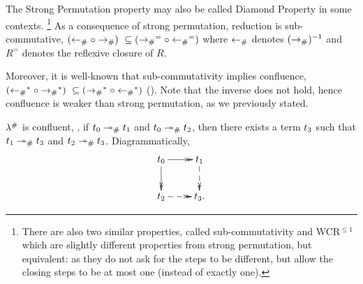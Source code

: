 \bigskip


The Strong Permutation property may also be called Diamond Property in some contexts.
\footnote{There are also two similar properties, called sub-commutativity and WCR$^{\leq 1}$
which are slightly different properties
from strong permutation,
but equivalent:
as they do not ask for the steps to be different,
but allow the closing steps to be at most one (instead of exactly one).}
As a consequence of strong permutation, reduction is sub-commutative,
\ie $(\mathrel{\leftarrow_{\mathtt{\#}}} \circ \mathrel{\to_{\mathtt{\#}}})\ \subseteq (\mathrel{\to_{\mathtt{\#}}}^= \circ \mathrel{\leftarrow_{\mathtt{\#}}}^=)$
where
$\mathrel{\leftarrow_{\mathtt{\#}}}$ denotes $(\mathrel{\to_{\mathtt{\#}}})^{-1}$
and $R^=$ denotes the reflexive closure of $R$.

Moreover, it is well-known that sub-commutativity implies confluence,
\ie $(\mathrel{\leftarrow_{\mathtt{\#}}}^* \circ \mathrel{\to_{\mathtt{\#}}}^*)\ \subseteq (\mathrel{\to_{\mathtt{\#}}}^* \circ \mathrel{\leftarrow_{\mathtt{\#}}}^*)$
(\cf \cite[Proposition 1.1.10]{Terese}). Note that the
inverse does not hold, hence confluence is weaker than strong permutation, as we previously stated.

\begin{corollary}[Confluence]
$\lambda^{\mathtt{\#}}$ is confluent, \ie,
if $t_0 \mathrel{\mathrel{\twoheadrightarrow}_{\mathtt{\#}}} t_1$ and $t_0 \mathrel{\mathrel{\twoheadrightarrow}_{\mathtt{\#}}} t_2$, then there exists a term $t_3$
such that $t_1 \mathrel{\mathrel{\twoheadrightarrow}_{\mathtt{\#}}} t_3$ and $t_2 \mathrel{\mathrel{\twoheadrightarrow}_{\mathtt{\#}}} t_3$.
Diagrammatically,
\[
    \xymatrix{
      \tm_0 \ar@{->>}[d]
            \ar@{->>}[r] &
      \tm_1 \ar@{-->>}[d] \\
            \ar@{-->>}[r]
      \tm_2 &
      \tm_3. \\
    }
\]
\end{corollary}



